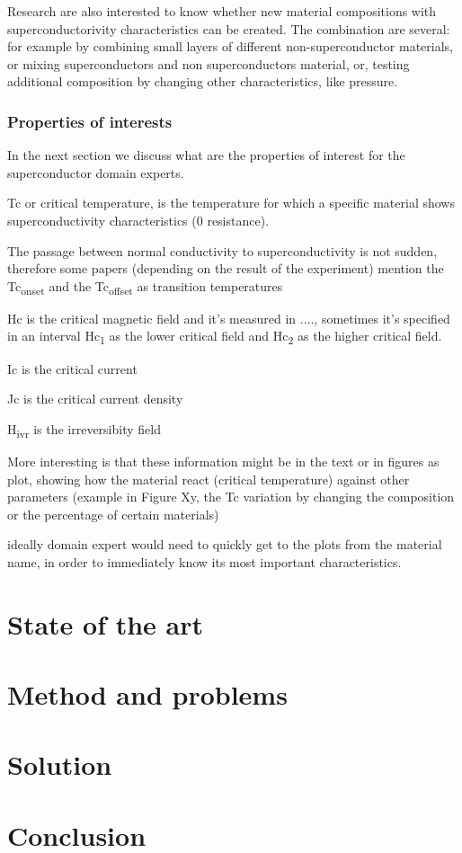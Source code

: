 \documentclass{article}
\begin{document}
Research are also interested to know whether new material compositions with superconductorivity characteristics can be created. The combination are several: for example by combining small layers of different non-superconductor materials, or mixing superconductors and non superconductors material, or, testing additional composition by changing other characteristics, like pressure. 

\subsubsection{Properties of interests}
In the next section we discuss what are the properties of interest for the superconductor domain experts. 

Tc or critical temperature, is the temperature for which a specific material shows superconductivity characteristics (0 resistance). 

The passage between normal conductivity to superconductivity is not sudden, therefore some papers (depending on the result of the experiment) mention the Tc\textsubscript{onset} and the Tc\textsubscript{offset} as transition temperatures

Hc is the critical magnetic field and it's measured in ...., sometimes it's specified in an interval Hc\textsubscript{1} as the lower critical field and Hc\textsubscript{2} as the higher critical field. 

Ic is the critical current

Jc is the critical current density

H\textsubscript{ivr} is the irreversibity field 

More interesting is that these information might be in the text or in figures as plot, showing how the material react (critical temperature) against other parameters (example in Figure Xy, the Tc variation by changing the composition or the percentage of certain materials)


ideally domain expert would need to quickly get to the plots from the material name, in order to immediately know its most important characteristics. 






\section{State of the art} 

\section{Method and problems}

\section{Solution}

\section{Conclusion}

\listoffigures



\end{document}
